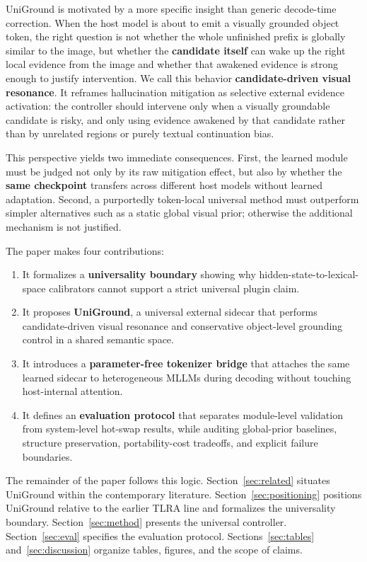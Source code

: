 UniGround is motivated by a more specific insight than generic decode-time correction. When the host model is about to emit a visually grounded object token, the right question is not whether the whole unfinished prefix is globally similar to the image, but whether the \textbf{candidate itself} can wake up the right local evidence from the image and whether that awakened evidence is strong enough to justify intervention. We call this behavior \textbf{candidate-driven visual resonance}. It reframes hallucination mitigation as selective external evidence activation: the controller should intervene only when a visually groundable candidate is risky, and only using evidence awakened by that candidate rather than by unrelated regions or purely textual continuation bias.

This perspective yields two immediate consequences. First, the learned module must be judged not only by its raw mitigation effect, but also by whether the \textbf{same checkpoint} transfers across different host models without learned adaptation. Second, a purportedly token-local universal method must outperform simpler alternatives such as a static global visual prior; otherwise the additional mechanism is not justified.

The paper makes four contributions:
\begin{enumerate}
  \item It formalizes a \textbf{universality boundary} showing why hidden-state-to-lexical-space calibrators cannot support a strict universal plugin claim.
  \item It proposes \textbf{UniGround}, a universal external sidecar that performs candidate-driven visual resonance and conservative object-level grounding control in a shared semantic space.
  \item It introduces a \textbf{parameter-free tokenizer bridge} that attaches the same learned sidecar to heterogeneous MLLMs during decoding without touching host-internal attention.
  \item It defines an \textbf{evaluation protocol} that separates module-level validation from system-level hot-swap results, while auditing global-prior baselines, structure preservation, portability-cost tradeoffs, and explicit failure boundaries.
\end{enumerate}

The remainder of the paper follows this logic. Section~\ref{sec:related} situates UniGround within the contemporary literature. Section~\ref{sec:positioning} positions UniGround relative to the earlier TLRA line and formalizes the universality boundary. Section~\ref{sec:method} presents the universal controller. Section~\ref{sec:eval} specifies the evaluation protocol. Sections~\ref{sec:tables} and~\ref{sec:discussion} organize tables, figures, and the scope of claims.

